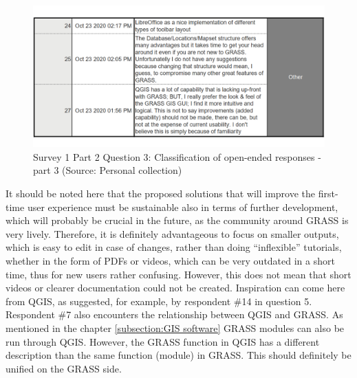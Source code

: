 \documentclass[a4paper,10pt,twoside]{article}
\begin{document}
\newpage
\vspace{0.3cm}
\begin{figure}[hbt!] 
\begin{center}
\includegraphics[width=15cm]{../surveys/analyzed_data/survey1_part2_question3_open_ended-2_1} 
\caption[Survey 1 Part 2 Question 3: Classification of open-ended responses - part 3]{Survey 1 Part 2 Question 3: Classification of open-ended responses - part 3 (Source: Personal collection)}
\label{fig:survey1_part2_question3_open_ended3_1}
\end{center}
\end{figure}

\noindent  It should be noted here that the proposed solutions that will improve the first-time user experience must be sustainable also in terms of further development, which will probably be crucial in the future, as the community around GRASS is very lively. Therefore, it is definitely advantageous to focus on smaller outputs, which is easy to edit in case of changes, rather than doing ``inflexible'' tutorials, whether in the form of PDFs or videos, which can be very outdated in a short time, thus for new users rather confusing. However, this does not mean that short videos or clearer documentation could not be created. Inspiration can come here from QGIS, as suggested, for example, by respondent \#14 in question 5. Respondent \#7 also encounters the relationship between QGIS and GRASS. As mentioned in the chapter \ref{subsection:GIS software} GRASS modules can also be run through QGIS. However, the GRASS function in QGIS has a different description than the same function (module) in GRASS. This should definitely be unified on the GRASS side.
 
\end{document}
